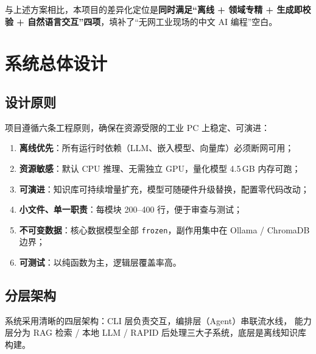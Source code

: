\documentclass[12pt,a4paper,fontset=none]{ctexart}
\begin{document}
\noindent 与上述方案相比，本项目的差异化定位是\textbf{同时满足“离线 + 领域专精 + 生成即校验 +
自然语言交互”四项}，填补了“无网工业现场的中文 AI 编程”空白。

\section{系统总体设计}

\subsection{设计原则}
项目遵循六条工程原则，确保在资源受限的工业 PC 上稳定、可演进：

\begin{enumerate}
  \item \textbf{离线优先}：所有运行时依赖（LLM、嵌入模型、向量库）必须断网可用；
  \item \textbf{资源敏感}：默认 CPU 推理、无需独立 GPU，量化模型 4.5\,GB 内存可跑；
  \item \textbf{可演进}：知识库可持续增量扩充，模型可随硬件升级替换，配置零代码改动；
  \item \textbf{小文件、单一职责}：每模块 200--400 行，便于审查与测试；
  \item \textbf{不可变数据}：核心数据模型全部 \texttt{frozen}，副作用集中在
        Ollama / ChromaDB 边界；
  \item \textbf{可测试}：以纯函数为主，逻辑层覆盖率高。
\end{enumerate}

\subsection{分层架构}
系统采用清晰的四层架构：CLI 层负责交互，编排层（Agent）串联流水线，
能力层分为 RAG 检索 / 本地 LLM / RAPID 后处理三大子系统，底层是离线知识库构建。
\end{document}
